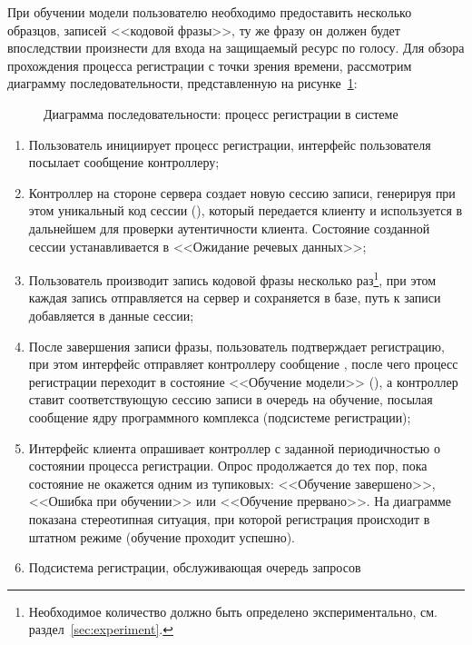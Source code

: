 При обучении модели пользователю необходимо предоставить несколько образцов,
записей <<кодовой фразы>>, ту же фразу он должен будет впоследствии произнести
для входа на защищаемый ресурс по голосу. Для обзора прохождения процесса регистрации с
точки зрения времени, рассмотрим диаграмму последовательности, представленную на
рисунке~\ref{fig:seq_enrollment}:

\begin{figure}[hp!]
    \center{
        \fontsize{12}{14}\selectfont
        
    }
    \caption{Диаграмма последовательности: процесс регистрации в системе}
    \label{fig:seq_enrollment}
\end{figure}

\begin{enumerate}
\item Пользователь инициирует процесс регистрации, интерфейс пользователя
посылает сообщение  контроллеру;
\item Контроллер на стороне сервера создает новую сессию записи, генерируя при
этом уникальный код сессии (), который передается клиенту и
используется в дальнейшем для проверки аутентичности клиента. Состояние
созданной сессии устанавливается в <<Ожидание речевых данных>>;
\item Пользователь производит запись кодовой фразы несколько
раз\footnote{Необходимое количество должно быть определено экспериментально, см.
раздел~\ref{sec:experiment}.}, при этом каждая запись отправляется на сервер и
сохраняется в базе, путь к записи добавляется в данные сессии;
\item После завершения записи фразы, пользователь подтверждает регистрацию, при
этом интерфейс отправляет контроллеру сообщение , после чего
процесс регистрации переходит в состояние <<Обучение модели>> (),
а контроллер ставит соответствующую сессию записи в очередь на обучение, посылая
сообщение  ядру программного комплекса (подсистеме регистрации);
\item Интерфейс клиента опрашивает контроллер с заданной периодичностью о
состоянии процесса регистрации. Опрос продолжается до тех пор, пока состояние не
окажется одним из тупиковых: <<Обучение завершено>>, <<Ошибка при обучении>> или
<<Обучение прервано>>. На диаграмме показана стереотипная ситуация, при которой
регистрация происходит в штатном режиме (обучение проходит успешно).
\item \label{enum:enroll} Подсистема регистрации, обслуживающая очередь запросов

\end{enumerate}
